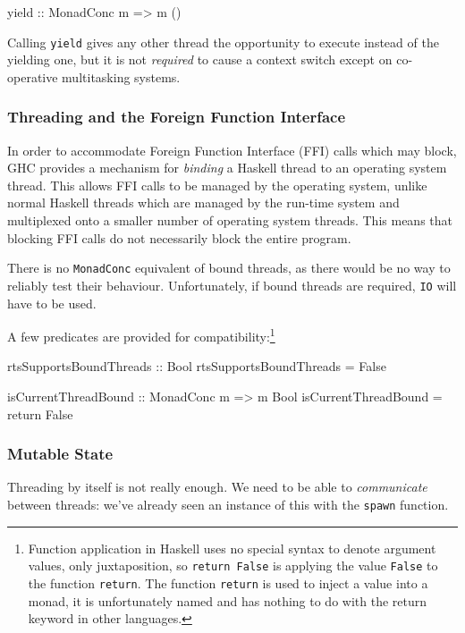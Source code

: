 \begin{haskellcode}
yield :: MonadConc m => m ()
\end{haskellcode}

Calling \verb|yield| gives any other thread the opportunity to execute
instead of the yielding one, but it is not \emph{required} to cause a
context switch except on co-operative multitasking systems.

\subsubsection{Threading and the Foreign Function Interface}
\label{sec:abstraction-typeclass-ffithreads}

In order to accommodate Foreign Function Interface (FFI) calls which
may block, GHC provides a mechanism for \emph{binding} a Haskell
thread to an operating system thread. This allows FFI calls to be
managed by the operating system, unlike normal Haskell threads which
are managed by the run-time system and multiplexed onto a smaller
number of operating system threads. This means that blocking FFI calls
do not necessarily block the entire program.

There is no \verb|MonadConc| equivalent of bound threads, as there
would be no way to reliably test their behaviour. Unfortunately, if
bound threads are required, \verb|IO| will have to be used.

A few predicates are provided for compatibility:\footnote{Function
  application in Haskell uses no special syntax to denote argument
  values, only juxtaposition, so \texttt{return False} is applying the
  value \texttt{False} to the function \texttt{return}. The function
  \texttt{return} is used to inject a value into a monad, it is
  unfortunately named and has nothing to do with the return keyword in
  other languages.}

\begin{haskellcode}
rtsSupportsBoundThreads :: Bool
rtsSupportsBoundThreads = False

isCurrentThreadBound :: MonadConc m => m Bool
isCurrentThreadBound = return False
\end{haskellcode}

\subsubsection{Mutable State}
\label{sec:abstraction-typeclass-crefs}

Threading by itself is not really enough. We need to be able to
\emph{communicate} between threads: we've already seen an instance
of this with the \verb|spawn| function.

